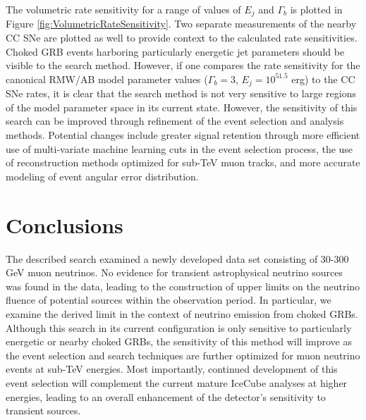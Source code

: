 \documentclass[manuscript]{aastex}
\begin{document}
The volumetric rate sensitivity for a range of values of $E_j$ and $\Gamma_b$ is plotted in Figure \ref{fig:VolumetricRateSensitivity}. Two separate measurements of the nearby CC SNe are plotted as well to provide context to the calculated rate sensitivities. Choked GRB events harboring particularly energetic jet parameters should be visible to the search method. However, if one compares the rate sensitivity for the canonical RMW/AB model parameter values ($\Gamma_b = 3$, $E_j = 10^{51.5}$ erg) to the CC SNe rates, it is clear that the search method is not very sensitive to large regions of the model parameter space in its current state. However, the sensitivity of this search can be improved through refinement of the event selection and analysis methods. Potential changes include greater signal retention through more efficient use of multi-variate machine learning cuts in the event selection process, the use of reconstruction methods optimized for sub-TeV muon tracks, and more accurate modeling of event angular error distribution. 

\section{Conclusions}
The described search examined a newly developed data set consisting of 30-300 GeV muon neutrinos. No evidence for transient astrophysical neutrino sources was found in the data, leading to the construction of upper limits on the neutrino fluence of potential sources within the observation period. In particular, we examine the derived limit in the context of neutrino emission from choked GRBs. Although this search in its current configuration is only sensitive to particularly energetic or nearby choked GRBs, the sensitivity of this method will improve as the event selection and search techniques are further optimized for muon neutrino events at sub-TeV energies. Most importantly, continued development of this event selection will complement the current mature IceCube analyses at higher energies, leading to an overall enhancement of the detector's sensitivity to transient sources.
\end{document}
